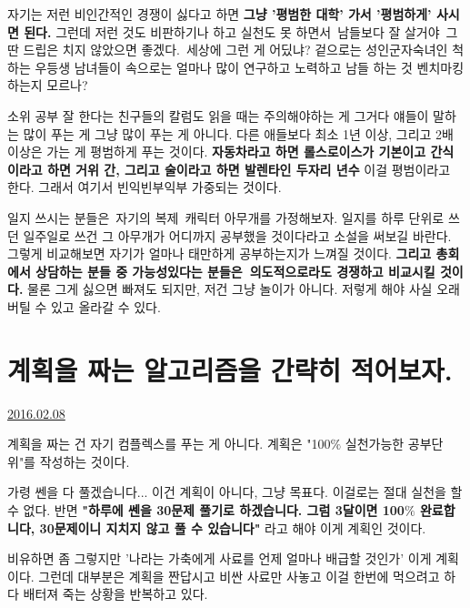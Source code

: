 자기는 저런 비인간적인 경쟁이 싫다고 하면 \textbf{그냥 '평범한 대학' 가서 '평범하게' 사시면 된다.}
그런데 저런 것도 비판하기나 하고 실천도 못 하면서 남들보다 잘 살거야 그딴 드립은 치지 않았으면 좋겠다. 세상에 그런 게 어딨냐?
겉으로는 성인군자숙녀인 척하는 우등생 남녀들이 속으로는 얼마나 많이 연구하고 노력하고 남들 하는 것 벤치마킹하는지 모르나?
\vspace{5mm}

소위 공부 잘 한다는 친구들의 칼럼도 읽을 때는 주의해야하는 게 그거다
얘들이 말하는 많이 푸는 게 그냥 많이 푸는 게 아니다. 다른 애들보다 최소 1년 이상, 그리고 2배 이상은 가는 게 평범하게 푸는 것이다.
\textbf{자동차라고 하면 롤스로이스가 기본이고 간식이라고 하면 거위 간, 그리고 술이라고 하면 발렌타인 두자리 년수}
이걸 평범이라고 한다. 그래서 여기서 빈익빈부익부 가중되는 것이다.
\vspace{5mm}

일지 쓰시는 분들은 자기의 복제 캐릭터 아무개를 가정해보자.
일지를 하루 단위로 쓰던 일주일로 쓰건 그 아무개가 어디까지 공부했을 것이다라고 소설을 써보길 바란다.
그렇게 비교해보면 자기가 얼마나 태만하게 공부하는지가 느껴질 것이다.
\textbf{그리고 총회에서 상담하는 분들 중 가능성있다는 분들은 의도적으로라도 경쟁하고 비교시킬 것이다.}
물론 그게 싫으면 빠져도 되지만, 저건 그냥 놀이가 아니다. 저렇게 해야 사실 오래 버틸 수 있고 올라갈 수 있다.
\vspace{5mm}










\section{계획을 짜는 알고리즘을 간략히 적어보자.}
\href{https://www.kockoc.com/Apoc/628832}{2016.02.08}

\vspace{5mm}

계획을 짜는 건 자기 컴플렉스를 푸는 게 아니다.
계획은 "100$\%$ 실천가능한 공부단위"를 작성하는 것이다.
\vspace{5mm}

가령 쎈을 다 풀겠습니다... 이건 계획이 아니다, 그냥 목표다. 이걸로는 절대 실천을 할 수 없다.
반면 \textbf{"하루에 쎈을 30문제 풀기로 하겠습니다. 그럼 3달이면 100$\%$ 완료합니다, 30문제이니 지치지 않고 풀 수 있습니다"}
라고 해야 이게 계획인 것이다.
\vspace{5mm}

비유하면 좀 그렇지만 '나라는 가축에게 사료를 언제 얼마나 배급할 것인가'
이게 계획이다. 그런데 대부분은 계획을 짠답시고 비싼 사료만 사놓고 이걸 한번에 먹으려고 하다 배터져 죽는 상황을 반복하고 있다.
\vspace{5mm}

